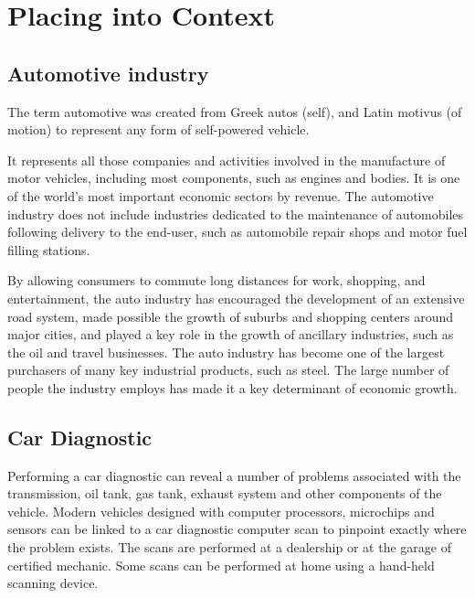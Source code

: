 
\chapter{Placing into Context} %

\label{Chapter3} %



\section{Automotive industry}

The term automotive was created from Greek autos (self), and Latin motivus (of motion) to represent any form of self-powered vehicle.

It represents all those companies and activities involved in the manufacture of motor vehicles, including most components, such as engines and bodies. It is one of the world's most important economic sectors by revenue. The automotive industry does not include industries dedicated to the maintenance of automobiles following delivery to the end-user, such as automobile repair shops and motor fuel filling stations.\cite{7}

By allowing consumers to commute long distances for work, shopping, and entertainment, the auto industry has encouraged the development of an extensive road system, made possible the growth of suburbs and shopping centers around major cities, and played a key role in the growth of ancillary industries, such as the oil and travel businesses. The auto industry has become one of the largest purchasers of many key industrial products, such as steel. The large number of people the industry employs has made it a key determinant of economic growth.\cite{7}

\section{Car Diagnostic}
Performing a car diagnostic can reveal a number of problems associated with the transmission, oil tank, gas tank, exhaust system and other components of the vehicle. Modern vehicles designed with computer processors, microchips and sensors can be linked to a car diagnostic computer scan to pinpoint exactly where the problem exists. The scans are performed at a dealership or at the garage of certified mechanic. Some scans can be performed at home using a hand-held scanning device.\cite{7}


